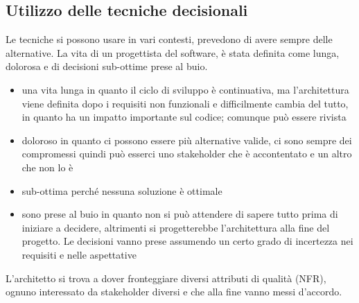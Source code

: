 \documentclass{article}
\begin{document}
\subsection{Utilizzo delle tecniche decisionali}
Le tecniche si possono usare in vari contesti, prevedono di avere sempre delle alternative. La vita di un progettista del software, è stata definita come lunga, dolorosa e di decisioni sub-ottime prese al buio. 
\begin{itemize}
\item una vita lunga in quanto il ciclo di sviluppo è continuativa, ma l'architettura viene definita dopo i requisiti non funzionali e difficilmente cambia del tutto, in quanto ha un impatto importante sul codice; comunque può essere rivista
\item doloroso in quanto ci possono essere più alternative valide, ci sono sempre dei compromessi quindi può esserci uno stakeholder che è accontentato e un altro che non lo è
\item sub-ottima perché nessuna soluzione è ottimale
\item sono prese al buio in quanto non si può attendere di sapere tutto prima di iniziare a decidere, altrimenti si progetterebbe l'architettura alla fine del progetto. Le decisioni vanno prese assumendo un certo grado di incertezza nei requisiti e nelle aspettative
\end{itemize}
L'architetto si trova a dover fronteggiare diversi attributi di qualità (NFR), ognuno interessato da stakeholder diversi e che alla fine vanno messi d'accordo.
\end{document}

